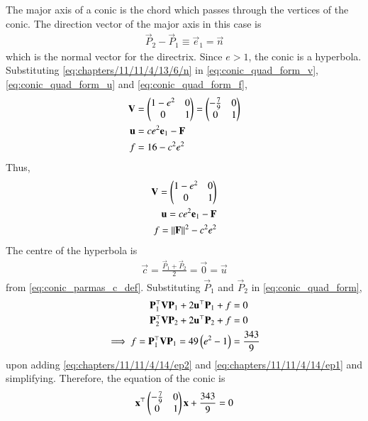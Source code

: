     The major axis of a conic is the chord which passes through the vertices of the conic.
    The direction vector of the major axis in this case is
    \begin{align}
        \vec{P}_2-\vec{P}_1 \equiv \vec{e}_1 = \vec{n}
\label{eq:chapters/11/11/4/13/6/n} 
    \end{align}
    which is the normal vector for the directrix.
    Since $e > 1$, the conic is a hyperbola.
Substituting  
\eqref{eq:chapters/11/11/4/13/6/n} 
in
  \eqref{eq:conic_quad_form_v},
\eqref{eq:conic_quad_form_u}
and
\eqref{eq:conic_quad_form_f},
\begin{align}
	\mathbf{V} &= \begin{pmatrix}1-e^2&0\\0&1\end{pmatrix} = \begin{pmatrix}-\frac{7}{9}&0\\0&1\end{pmatrix} \label{eq:chapters/11/11/4/14/6} 
	\\
	\mathbf{u} &= ce^2\mathbf{e}_1-\mathbf{F}
\label{eq:chapters/11/11/4/14/6/u} 
	\\
	f&=16-c^2e^2
\label{eq:chapters/11/11/4/14/6/f} 
\end{align}
    Thus,
    \begin{align}
        \mathbf{V} = \begin{pmatrix}1-e^2&0\\0&1\end{pmatrix} \label{eq:chapters/11/11/4/14/V-val} \\
	    \mathbf{u} = ce^2\mathbf{e}_1 - \mathbf{F} \label{eq:chapters/11/11/4/14/u-val} \\
        f = \left\lVert\mathbf{F}\right\rVert^2 - c^2e^2 \label{eq:chapters/11/11/4/14/f-val}
    \end{align}
    The centre of the hyperbola is 
\begin{align}
	\vec{c} = \frac{\vec{P}_1+\vec{P}_2}{2} = \vec{0} = \vec{u}
\end{align}
from \eqref{eq:conic_parmas_c_def}.      Substituting $\vec{P}_1$ and $\vec{P}_2$ in 
    \eqref{eq:conic_quad_form},
    \begin{align}
        \mathbf{P}_1^\top\mathbf{VP}_1 + 2\mathbf{u}^\top\mathbf{P}_1 + f &= 0 \label{eq:chapters/11/11/4/14/ep1} \\
        \mathbf{P}_2^\top\mathbf{VP}_2 + 2\mathbf{u}^\top\mathbf{P}_2 + f &= 0 \label{eq:chapters/11/11/4/14/ep2}
	\\
	    \implies f = \mathbf{P}_1^\top\mathbf{VP}_1  = 49\left(e^2-1\right)&=\frac{343}{9}
    \end{align}
    upon adding 
    \eqref{eq:chapters/11/11/4/14/ep2} and \eqref{eq:chapters/11/11/4/14/ep1}
    and simplifying.
    Therefore, the equation of the conic is
    \begin{align}
        \mathbf{x}^\top\begin{pmatrix}-\frac{7}{9}&0\\0&1\end{pmatrix}\mathbf{x} + \frac{343}{9} = 0
    \end{align}
